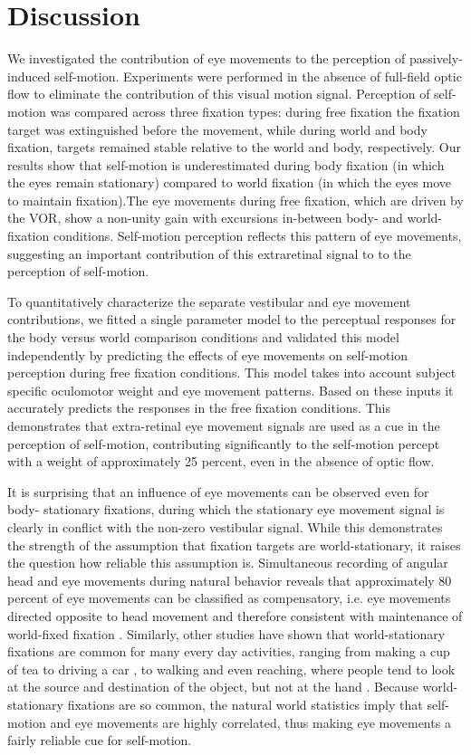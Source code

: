 \section{Discussion}

We investigated the contribution of eye movements to the perception of passively-induced self-motion. Experiments were performed in the absence of full-field optic flow to eliminate the contribution of this visual motion signal. Perception of self-motion was compared across three fixation types: during free fixation the fixation target was extinguished before the movement, while during world and body fixation, targets  remained stable relative to the world and body, respectively. Our results show that self-motion is underestimated during body fixation (in which the eyes remain stationary) compared to world fixation (in which the eyes move to maintain fixation).The eye movements during free fixation, which  are driven by the VOR, show a non-unity gain with excursions in-between body- and world-fixation conditions. Self-motion perception reflects this pattern of eye movements, suggesting an important contribution of this extraretinal signal to to the perception of self-motion.

 To quantitatively characterize the separate vestibular and eye movement contributions, we fitted a single parameter model to the perceptual responses for the body versus world comparison conditions and validated this model independently by predicting the effects of eye movements on self-motion perception during free fixation conditions. This model takes into account subject specific oculomotor weight and eye movement patterns. Based on these inputs it accurately predicts the responses in the free fixation conditions. This demonstrates that extra-retinal eye movement signals are used as a cue in the perception of self-motion, contributing significantly to the self-motion percept with a weight of approximately 25 percent, even in the absence of optic flow.
 
It is surprising that an influence of eye movements can be observed even for body- stationary fixations, during which the stationary eye movement signal is clearly in conflict with the non-zero vestibular signal. While this demonstrates the strength of the assumption that fixation targets are world-stationary, it raises the question how reliable this assumption is. Simultaneous recording of angular head and eye movements during natural behavior reveals that approximately 80 percent of eye movements can be classified as compensatory, i.e. eye movements directed opposite to head movement and therefore consistent with maintenance of world-fixed fixation \cite{einhauser2007}. Similarly, other studies have shown that world-stationary fixations are common for many every day activities, ranging from making a cup of tea \cite{hayhoe2014} to driving a car \cite{land1994}, to walking \cite{foulsham2011} and even reaching, where people tend to look at the source and destination of the object, but not at the hand \cite{flanagan2003}. Because world-stationary fixations are so common, the natural world statistics imply that self-motion and eye movements are highly correlated, thus making eye movements a fairly reliable cue for self-motion.

